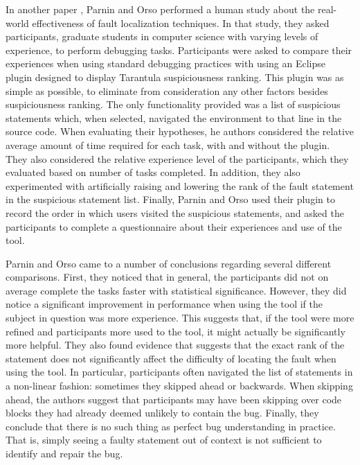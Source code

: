 In another paper \cite{parnin}, Parnin and Orso performed a human study about the
real-world effectiveness of fault localization techniques.  In that
study, they asked participants, graduate students in computer science
with varying levels of experience, to perform debugging tasks.
Participants were asked to compare their experiences when using standard
debugging practices with using an Eclipse plugin designed to display
Tarantula suspiciousness ranking.  This plugin was as simple as possible,
to eliminate from consideration any other factors besides suspiciousness
ranking.  The only functionality provided was a list of suspicious statements
which, when selected, navigated the environment to that line in the source
code.  When evaluating their hypotheses, he authors considered the
relative average amount of time required for each task, with and without
the plugin.  They also considered the relative experience level of the 
participants, which they evaluated based on number of tasks completed.  In 
addition, they also experimented with artificially raising and lowering
the rank of the fault statement in the suspicious statement list.  Finally,
Parnin and Orso used their plugin to record the order in which users
visited the suspicious statements, and asked the participants to complete
a questionnaire about their experiences and use of the tool.

Parnin and Orso came to a number of conclusions regarding several different
comparisons.  First, they noticed that in general, the participants did not
on average complete the tasks faster with statistical significance.  However,
they did notice a significant improvement in performance when using the tool
if the subject in question was more experience.  This suggests that, if the
tool were more refined and participants more used to the tool, it might actually
be significantly more helpful.  They also found evidence that suggests that the
exact rank of the statement does not significantly affect the difficulty of
locating the fault when using the tool.  In particular, participants often 
navigated the list of statements in a non-linear fashion: sometimes they skipped
ahead or backwards.  When skipping ahead, the authors suggest that participants
may have been skipping over code blocks they had already deemed unlikely to contain
the bug.  Finally, they conclude that there is no such thing as perfect bug 
understanding in practice.  That is, simply seeing a faulty statement out of 
context is not sufficient to identify and repair the bug.

